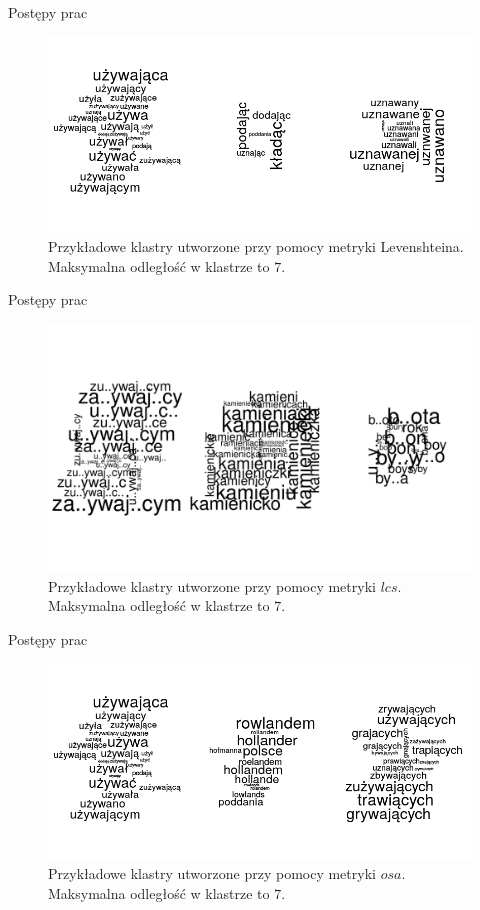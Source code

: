 \documentclass[11pt,pdftex,mathserif]{beamer}\usepackage[]{graphicx}\usepackage[]{color}
\theoremstyle{definition}
\begin{document}
\begin{frame}{Postępy prac}
\begin{figure}[h]
      \centering
      \includegraphics[width=12cm] {lv}
      \caption{Przykładowe klastry utworzone przy pomocy metryki Levenshteina. Maksymalna odległość w klastrze to $7$.}
    \end{figure}
\end{frame}



\begin{frame}{Postępy prac}
\begin{figure}[h]
      \centering
      \includegraphics[width=12cm] {lcs}
      \caption{Przykładowe klastry utworzone przy pomocy metryki $lcs$. Maksymalna odległość w klastrze to $7$.}
    \end{figure}
\end{frame}



\begin{frame}{Postępy prac}
\begin{figure}[h]
      \centering
      \includegraphics[width=12cm] {osa}
      \caption{Przykładowe klastry utworzone przy pomocy metryki $osa$. Maksymalna odległość w klastrze to $7$.}
    \end{figure}
\end{frame}
\end{document}
